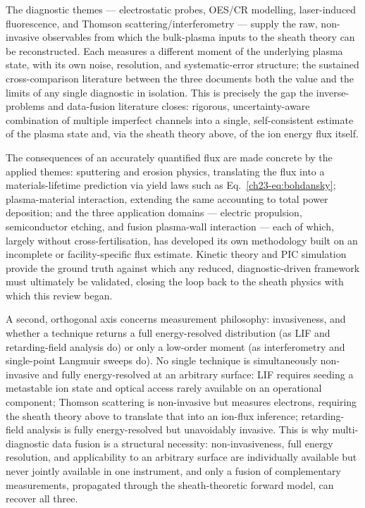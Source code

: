 The diagnostic themes — electrostatic probes, OES/CR modelling, laser-induced fluorescence, and Thomson scattering/interferometry — supply the raw, non-invasive observables from which the bulk-plasma inputs to the sheath theory can be reconstructed. Each measures a different moment of the underlying plasma state, with its own noise, resolution, and systematic-error structure; the sustained cross-comparison literature between the three documents both the value and the limits of any single diagnostic in isolation. This is precisely the gap the inverse-problems and data-fusion literature closes: rigorous, uncertainty-aware combination of multiple imperfect channels into a single, self-consistent estimate of the plasma state and, via the sheath theory above, of the ion energy flux itself.

The consequences of an accurately quantified flux are made concrete by the applied themes: sputtering and erosion physics, translating the flux into a materials-lifetime prediction via yield laws such as Eq.~\eqref{ch23-eq:bohdansky}; plasma-material interaction, extending the same accounting to total power deposition; and the three application domains — electric propulsion, semiconductor etching, and fusion plasma-wall interaction — each of which, largely without cross-fertilisation, has developed its own methodology built on an incomplete or facility-specific flux estimate. Kinetic theory and PIC simulation provide the ground truth against which any reduced, diagnostic-driven framework must ultimately be validated, closing the loop back to the sheath physics with which this review began.

A second, orthogonal axis concerns measurement philosophy: invasiveness, and whether a technique returns a full energy-resolved distribution (as LIF and retarding-field analysis do) or only a low-order moment (as interferometry and single-point Langmuir sweeps do). No single technique is simultaneously non-invasive and fully energy-resolved at an arbitrary surface: LIF requires seeding a metastable ion state and optical access rarely available on an operational component; Thomson scattering is non-invasive but measures electrons, requiring the sheath theory above to translate that into an ion-flux inference; retarding-field analysis is fully energy-resolved but unavoidably invasive. This is why multi-diagnostic data fusion is a structural necessity: non-invasiveness, full energy resolution, and applicability to an arbitrary surface are individually available but never jointly available in one instrument, and only a fusion of complementary measurements, propagated through the sheath-theoretic forward model, can recover all three.

